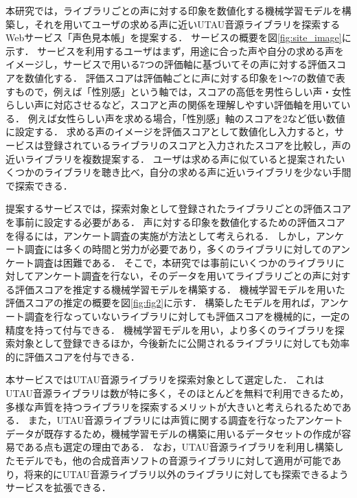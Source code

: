 本研究では，ライブラリごとの声に対する印象を数値化する機械学習モデルを構築し，それを用いてユーザの求める声に近いUTAU音源ライブラリを探索するWebサービス「声色見本帳」を提案する．
サービスの概要を図\ref{fig:site_image}に示す．
サービスを利用するユーザはまず，用途に合った声や自分の求める声をイメージし，サービスで用いる7つの評価軸に基づいてその声に対する評価スコアを数値化する．
評価スコアは評価軸ごとに声に対する印象を1〜7の数値で表すもので，例えば「性別感」という軸では，スコアの高低を男性らしい声・女性らしい声に対応させるなど，スコアと声の関係を理解しやすい評価軸を用いている．
例えば女性らしい声を求める場合，「性別感」軸のスコアを2など低い数値に設定する．
求める声のイメージを評価スコアとして数値化し入力すると，サービスは登録されているライブラリのスコアと入力されたスコアを比較し，声の近いライブラリを複数提案する．
ユーザは求める声に似ていると提案されたいくつかのライブラリを聴き比べ，自分の求める声に近いライブラリを少ない手間で探索できる．

提案するサービスでは，探索対象として登録されたライブラリごとの評価スコアを事前に設定する必要がある．
声に対する印象を数値化するための評価スコアを得るには，アンケート調査の実施が方法として考えられる．
しかし，アンケート調査には多くの時間と労力が必要であり，多くのライブラリに対してのアンケート調査は困難である．
そこで，本研究では事前にいくつかのライブラリに対してアンケート調査を行ない，そのデータを用いてライブラリごとの声に対する評価スコアを推定する機械学習モデルを構築する．
機械学習モデルを用いた評価スコアの推定の概要を図\ref{fig:fig2}に示す．
構築したモデルを用れば，アンケート調査を行なっていないライブラリに対しても評価スコアを機械的に，一定の精度を持って付与できる．
機械学習モデルを用い，より多くのライブラリを探索対象として登録できるほか，今後新たに公開されるライブラリに対しても効率的に評価スコアを付与できる．

本サービスではUTAU音源ライブラリを探索対象として選定した．
これはUTAU音源ライブラリは数が特に多く，そのほとんどを無料で利用できるため，多様な声質を持つライブラリを探索するメリットが大きいと考えられるためである．
また，UTAU音源ライブラリには声質に関する調査を行なったアンケートデータが既存するため，機械学習モデルの構築に用いるデータセットの作成が容易である点も選定の理由である．
なお，UTAU音源ライブラリを利用し構築したモデルでも，他の合成音声ソフトの音源ライブラリに対して適用が可能であり，将来的にUTAU音源ライブラリ以外のライブラリに対しても探索できるようサービスを拡張できる．

